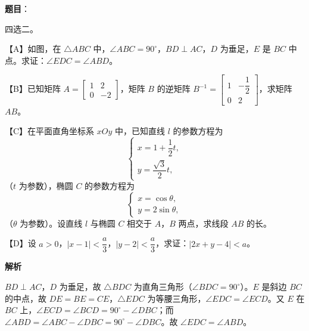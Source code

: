 \begin{answer}

\textbf{题目}：

四选二。

【A】如图，在 \(\triangle ABC\) 中，\(\angle ABC=90^{\circ}\)，\(BD\perp AC\)，\(D\) 为垂足，\(E\) 是 \(BC\) 中点。求证：\(\angle EDC=\angle ABD\)。
\nopagebreak[4]
\begin{center}\end{center}
\nopagebreak[4]
【B】已知矩阵 $A=\begin{bmatrix}1&2\\0&-2\end{bmatrix}$，矩阵 \(B\) 的逆矩阵 $B^{-1}=\begin{bmatrix}1&-\dfrac{1}{2}\\0&2\end{bmatrix}$，求矩阵 \(AB\)。

【C】在平面直角坐标系 \(xOy\) 中，已知直线 \(l\) 的参数方程为
\nopagebreak[4]
\[
\begin{cases}
x=1+\dfrac{1}{2}t,\\
y=\dfrac{\sqrt{3}}{2}t,
\end{cases}
\]
（\(t\) 为参数），椭圆 \(C\) 的参数方程为
\nopagebreak[4]
\[
\begin{cases}
x=\cos\theta,\\
y=2\sin\theta,
\end{cases}
\]
（\(\theta\) 为参数）。设直线 \(l\) 与椭圆 \(C\) 相交于 \(A\)，\(B\) 两点，求线段 \(AB\) 的长。

【D】设 \(a>0\)，\(|x-1|<\dfrac{a}{3}\)，\(|y-2|<\dfrac{a}{3}\)，求证：\(|2x+y-4|<a\)。

\textbf{解析}


\(BD\perp AC\)，\(D\) 为垂足，故 \(\triangle BDC\) 为直角三角形（\(\angle BDC=90^{\circ}\)）。\(E\) 是斜边 \(BC\) 的中点，故 \(DE=BE=CE\)，\(\triangle EDC\) 为等腰三角形，\(\angle EDC=\angle ECD\)。又 \(E\) 在 \(BC\) 上，\(\angle ECD=\angle BCD=90^{\circ}-\angle DBC\)；而 \(\angle ABD=\angle ABC-\angle DBC=90^{\circ}-\angle DBC\)。故 \(\angle EDC=\angle ABD\)。



\end{answer}
